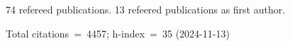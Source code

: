 74 refereed publications. 13 refeered publications as first author.

Total citations~=~4457; h-index~=~35 (2024-11-13)
